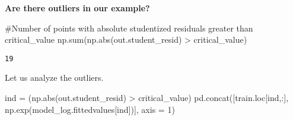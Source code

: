 \documentclass[
  letterpaper,
  DIV=11,
  numbers=noendperiod]{scrreprt}
\newenvironment{Shaded}{\begin{snugshade}}{\end{snugshade}}
\newcommand{\BuiltInTok}[1]{\textcolor[rgb]{0.00,0.23,0.31}{#1}}
\newcommand{\CommentTok}[1]{\textcolor[rgb]{0.37,0.37,0.37}{#1}}
\newcommand{\DecValTok}[1]{\textcolor[rgb]{0.68,0.00,0.00}{#1}}
\newcommand{\NormalTok}[1]{\textcolor[rgb]{0.00,0.23,0.31}{#1}}
\newcommand{\OperatorTok}[1]{\textcolor[rgb]{0.37,0.37,0.37}{#1}}
\begin{document}
\textbf{Are there outliers in our example?}

\begin{Shaded}
\begin{Highlighting}[]
\CommentTok{\#Number of points with absolute studentized residuals greater than critical\_value}
\NormalTok{np.}\BuiltInTok{sum}\NormalTok{(np.}\BuiltInTok{abs}\NormalTok{(out.student\_resid) }\OperatorTok{\textgreater{}}\NormalTok{ critical\_value)}
\end{Highlighting}
\end{Shaded}

\begin{verbatim}
19
\end{verbatim}

Let us analyze the outliers.

\begin{Shaded}
\begin{Highlighting}[]
\NormalTok{ind }\OperatorTok{=}\NormalTok{ (np.}\BuiltInTok{abs}\NormalTok{(out.student\_resid) }\OperatorTok{\textgreater{}}\NormalTok{ critical\_value)}
\NormalTok{pd.concat([train.loc[ind,:], np.exp(model\_log.fittedvalues[ind])], axis }\OperatorTok{=} \DecValTok{1}\NormalTok{)}
\end{Highlighting}
\end{Shaded}
\end{document}
